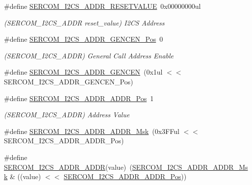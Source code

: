 \begin{DoxyCompactItemize}
\#define \mbox{\hyperlink{group___s_a_m_d21___s_e_r_c_o_m_ga02e529e24e6f8249d665398fea94b78f}{S\+E\+R\+C\+O\+M\+\_\+\+I2\+C\+S\+\_\+\+A\+D\+D\+R\+\_\+\+R\+E\+S\+E\+T\+V\+A\+L\+UE}}~0x00000000ul
\begin{DoxyCompactList}\small\item\em (S\+E\+R\+C\+O\+M\+\_\+\+I2\+C\+S\+\_\+\+A\+D\+DR reset\+\_\+value) I2\+CS Address \end{DoxyCompactList}\item 
\#define \mbox{\hyperlink{group___s_a_m_d21___s_e_r_c_o_m_ga4fab851205ca385c987b502accf4c888}{S\+E\+R\+C\+O\+M\+\_\+\+I2\+C\+S\+\_\+\+A\+D\+D\+R\+\_\+\+G\+E\+N\+C\+E\+N\+\_\+\+Pos}}~0
\begin{DoxyCompactList}\small\item\em (S\+E\+R\+C\+O\+M\+\_\+\+I2\+C\+S\+\_\+\+A\+D\+DR) General Call Address Enable \end{DoxyCompactList}\item 
\#define \mbox{\hyperlink{group___s_a_m_d21___s_e_r_c_o_m_ga80d3b7abd0dd7ff8bea028380b42449e}{S\+E\+R\+C\+O\+M\+\_\+\+I2\+C\+S\+\_\+\+A\+D\+D\+R\+\_\+\+G\+E\+N\+C\+EN}}~(0x1ul $<$$<$ S\+E\+R\+C\+O\+M\+\_\+\+I2\+C\+S\+\_\+\+A\+D\+D\+R\+\_\+\+G\+E\+N\+C\+E\+N\+\_\+\+Pos)
\item 
\#define \mbox{\hyperlink{group___s_a_m_d21___s_e_r_c_o_m_gad81283c820cb340d9f7913201029811a}{S\+E\+R\+C\+O\+M\+\_\+\+I2\+C\+S\+\_\+\+A\+D\+D\+R\+\_\+\+A\+D\+D\+R\+\_\+\+Pos}}~1
\begin{DoxyCompactList}\small\item\em (S\+E\+R\+C\+O\+M\+\_\+\+I2\+C\+S\+\_\+\+A\+D\+DR) Address Value \end{DoxyCompactList}\item 
\#define \mbox{\hyperlink{group___s_a_m_d21___s_e_r_c_o_m_gabf9e2354c63d5456871d34f428d00761}{S\+E\+R\+C\+O\+M\+\_\+\+I2\+C\+S\+\_\+\+A\+D\+D\+R\+\_\+\+A\+D\+D\+R\+\_\+\+Msk}}~(0x3\+F\+Ful $<$$<$ S\+E\+R\+C\+O\+M\+\_\+\+I2\+C\+S\+\_\+\+A\+D\+D\+R\+\_\+\+A\+D\+D\+R\+\_\+\+Pos)
\item 
\#define \mbox{\hyperlink{group___s_a_m_d21___s_e_r_c_o_m_ga66a0837da0253de94d64ffc3702cc5af}{S\+E\+R\+C\+O\+M\+\_\+\+I2\+C\+S\+\_\+\+A\+D\+D\+R\+\_\+\+A\+D\+DR}}(value)~(\mbox{\hyperlink{group___s_a_m_d21___s_e_r_c_o_m_gabf9e2354c63d5456871d34f428d00761}{S\+E\+R\+C\+O\+M\+\_\+\+I2\+C\+S\+\_\+\+A\+D\+D\+R\+\_\+\+A\+D\+D\+R\+\_\+\+Msk}} \& ((value) $<$$<$ \mbox{\hyperlink{group___s_a_m_d21___s_e_r_c_o_m_gad81283c820cb340d9f7913201029811a}{S\+E\+R\+C\+O\+M\+\_\+\+I2\+C\+S\+\_\+\+A\+D\+D\+R\+\_\+\+A\+D\+D\+R\+\_\+\+Pos}}))
$$
\end{DoxyCompactItemize}
